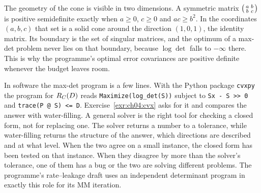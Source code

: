 The geometry of the cone is visible in two dimensions. A symmetric matrix $\begin{psmallmatrix}a&b\\b&c\end{psmallmatrix}$ is positive semidefinite exactly when $a\ge0$, $c\ge0$ and $ac\ge b^2$. In the coordinates $(a,b,c)$ that set is a solid cone around the direction $(1,0,1)$, the identity matrix. Its boundary is the set of singular matrices, and the optimum of a max-det problem never lies on that boundary, because $\log\det$ falls to $-\infty$ there. This is why the programme's optimal error covariances are positive definite whenever the budget leaves room.


In software the max-det program is a few lines. With the Python package \texttt{cvxpy} the program for $R_C(D)$ reads \texttt{Maximize(log\_det(S))} subject to \texttt{Sx - S >> 0} and \texttt{trace(P @ S) <= D}. Exercise~\ref{exr:ch04:cvx} asks for it and compares the answer with water-filling. A general solver is the right tool for checking a closed form, not for replacing one. The solver returns a number to a tolerance, while water-filling returns the structure of the answer, which directions are described and at what level. When the two agree on a small instance, the closed form has been tested on that instance. When they disagree by more than the solver's tolerance, one of them has a bug or the two are solving different problems. The programme's rate--leakage draft uses an independent determinant program in exactly this role for its MM iteration.


